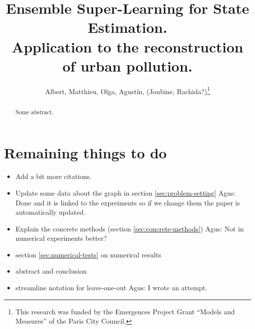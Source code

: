 \documentclass[11pt,a4paper,twoside]{article}
\newcommand{\ascomment}[1]{{\color{teal} Agus: #1}}
\theoremstyle{definition}
\numberwithin{equation}{section}
\newcommand{\<}{\langle}
\renewcommand{\>}{\rangle}
\begin{document}
\title{Ensemble Super-Learning for State Estimation. \\Application to the reconstruction of urban pollution.}
\author{Albert, Matthieu, Olga, Agustín, (Joubine, Rachida?)\thanks{This research was funded by the Emergences Project Grant ``Models and Measures'' of the Paris City Council.}
}
\date{}
\maketitle

\begin{abstract}
Some abstract.
\end{abstract}

\section*{Remaining things to do}
\begin{itemize}
\item Add a bit more citations.
\item Update some data about the graph in section \ref{sec:problem-setting}  \ascomment{Done and it is linked to the expreiments so if we change them the paper is automatically updated.}
\item Explain the concrete methods (section \ref{sec:concrete-methods}) \ascomment{Not in numerical experiments better?}
\item section \ref{sec:numerical-tests} on numerical results
\item abstract and conclusion
\item streamline notation for leave-one-out \ascomment{I wrote an attempt.}
\end{itemize}
\end{document}
